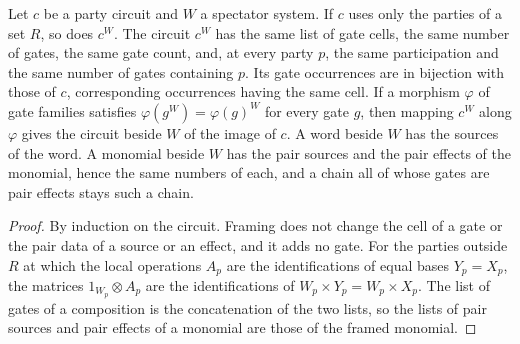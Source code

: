 \begin{theorem}
    \label{thm:party_frame_syntax}
    \leanok
    Let $c$ be a party circuit and $W$ a spectator system. If $c$ uses only the
    parties of a set $R$, so does $c^W$. The circuit $c^W$ has the same list of
    gate cells, the same number of gates, the same gate count, and, at every party
    $p$, the same participation and the same number of gates containing $p$. Its
    gate occurrences are in bijection with those of $c$, corresponding occurrences
    having the same cell. If a morphism $\varphi$ of gate families satisfies
    $\varphi(g^W)=\varphi(g)^W$ for every gate $g$, then mapping $c^W$ along
    $\varphi$ gives the circuit beside $W$ of the image of $c$. A word beside $W$
    has the sources of the word. A monomial beside $W$ has the pair sources and
    the pair effects of the monomial, hence the same numbers of each, and a chain
    all of whose gates are pair effects stays such a chain.
\end{theorem}
\begin{proof}\leanok
    By induction on the circuit. Framing does not change the cell of a gate or the
    pair data of a source or an effect, and it adds no gate. For the parties
    outside $R$ at which the local operations $A_p$ are the identifications of
    equal bases $Y_p=X_p$, the matrices $1_{W_p}\otimes A_p$ are the
    identifications of $W_p\times Y_p=W_p\times X_p$. The list of gates of a
    composition is the concatenation of the two lists, so the lists of pair sources
    and pair effects of a monomial are those of the framed monomial.
\end{proof}

